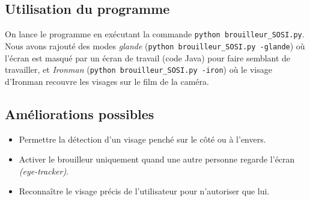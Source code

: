 \documentclass[11pt]{article}
\begin{document}
\subsection{Utilisation du programme}
On lance le programme en exécutant la commande \texttt{python brouilleur\_SOSI.py}. Nous avons rajouté des modes \emph{glande} (\texttt{python brouilleur\_SOSI.py -glande}) où l'écran est masqué par un écran de travail (code Java) pour faire semblant de travailler, et \emph{Ironman} (\texttt{python brouilleur\_SOSI.py -iron}) où le visage d'Ironman recouvre les visages sur le film de la caméra\cite{opencv_moust}.

\subsection{Améliorations possibles}
\begin{itemize}
\item Permettre la détection d'un visage penché sur le côté ou à l'envers.
\item Activer le brouilleur uniquement quand une autre personne regarde l'écran \emph{(eye-tracker)}.
\item Reconnaître le visage précis de l'utilisateur pour n'autoriser que lui.
\end{itemize}






\end{document}
